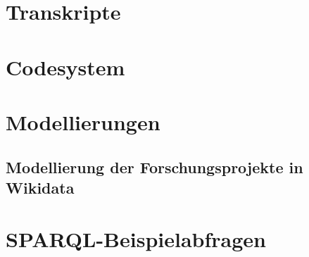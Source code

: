 \section{Transkripte}
\section{Codesystem}
\section{Modellierungen}
\subsection{Modellierung der Forschungsprojekte in Wikidata}
\begin{figure}[h]
    \centering
    \label{fig:x cubed graph}
\end{figure}

\section{SPARQL-Beispielabfragen}